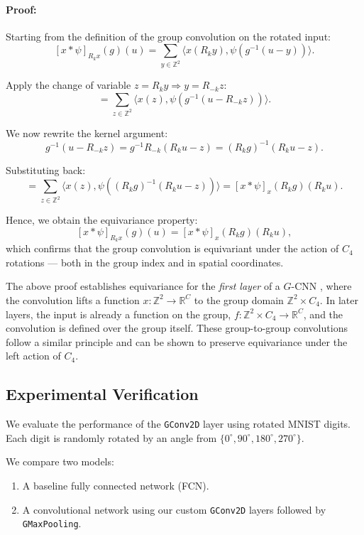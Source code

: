 \documentclass[11pt]{article}
\begin{document}
\paragraph{Proof:}

Starting from the definition of the group convolution on the rotated input:
\[
[x * \psi]_{R_k x}(g)(u) = \sum_{y \in \mathbb{Z}^2} \langle x(R_k y), \psi(g^{-1}(u - y)) \rangle.
\]

Apply the change of variable \( z = R_k y \Rightarrow y = R_{-k} z \):
\[
= \sum_{z \in \mathbb{Z}^2} \langle x(z), \psi(g^{-1}(u - R_{-k} z)) \rangle.
\]

We now rewrite the kernel argument:
\[
g^{-1}(u - R_{-k} z) = g^{-1} R_{-k} (R_k u - z) = (R_k g)^{-1}(R_k u - z).
\]

Substituting back:
\[
= \sum_{z \in \mathbb{Z}^2} \langle x(z), \psi((R_k g)^{-1}(R_k u - z)) \rangle
= [x * \psi]_x(R_k g)(R_k u).
\]

Hence, we obtain the equivariance property:
\[
[x * \psi]_{R_k x}(g)(u) = [x * \psi]_x(R_k g)(R_k u),
\]
which confirms that the group convolution is equivariant under the action of \( C_4 \) rotations — both in the group index and in spatial coordinates.


The above proof establishes equivariance for the \textit{first layer} of a \( G \)-CNN \cite{cohen2016groupequivariantconvolutionalnetworks}, where the convolution lifts a function \( x : \mathbb{Z}^2 \to \mathbb{R}^C \) to the group domain \( \mathbb{Z}^2 \times C_4 \). In later layers, the input is already a function on the group, \( f : \mathbb{Z}^2 \times C_4 \to \mathbb{R}^C \), and the convolution is defined over the group itself. These group-to-group convolutions follow a similar principle and can be shown to preserve equivariance under the left action of \( C_4 \).




\subsection*{Experimental Verification}

We evaluate the performance of the \texttt{GConv2D} layer using rotated MNIST digits. Each digit is randomly rotated by an angle from $\{0^\circ, 90^\circ, 180^\circ, 270^\circ\}$.

We compare two models:

\begin{enumerate}
    \item A baseline fully connected network (FCN).
    \item A convolutional network using our custom \texttt{GConv2D} layers followed by \texttt{GMaxPooling}.
\end{enumerate}
\end{document}
